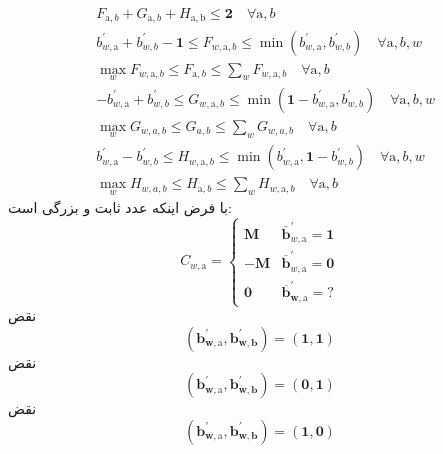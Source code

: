 \begin{equation}
	\begin{aligned}
		&{F}_{\mathrm{a}, {b}}+{G}_{\mathrm{a}, {b}}+{H}_{\mathrm{a}, \mathrm{b}} \leq \mathbf{2} \quad \forall \mathrm{a}, {b}\\
		&{b}_{w, \mathrm{a}}^{\prime}+{b}_{w, {b}}^{\prime}-\mathbf{1} \leq {F}_{w, \mathrm{a}, {b}} \leq \min \left({b}_{w, \mathrm{a}}^{\prime}, {b}_{w, b}^{\prime}\right) \quad \forall \mathrm{a}, {b}, {w}\\
		&\max _{w} {F}_{w, \mathrm{a}, {b}} \leq {F}_{\mathrm{a}, {b}} \leq \sum_{w} {F}_{w, \mathrm{a}, {b}} \quad \forall \mathrm{a}, {b}\\
		&-{b}_{w, \mathrm{a}}^{\prime}+{b}_{w, {b}}^{\prime} \leq {G}_{w, \mathrm{a}, {b}} \leq \min \left(\mathbf{1}-{b}_{w, \mathrm{a}}^{\prime}, {b}_{w, b}^{\prime}\right) \quad \forall \mathrm{a}, {b}, {w}\\
		&\max _{w} G_{w, a, b} \leq G_{a, b} \leq \sum_{w} G_{w, a, b} \quad \forall \mathrm{a}, b\\
		&{b}_{w, \mathrm{a}}^{\prime}-{b}_{w, b}^{\prime} \leq {H}_{w, \mathrm{a}, {b}} \leq \min \left({b}_{w, \mathrm{a}}^{\prime}, \mathbf{1}-{b}_{w, {b}}^{\prime}\right) \quad \forall \mathrm{a}, {b}, {w}\\
		&\max _{w} H_{w, a, b} \leq H_{\mathrm{a}, b} \leq \sum_{w} H_{w, \mathrm{a}, b} \quad \forall \mathrm{a}, {b}
	\end{aligned}
\end{equation}
با فرض اینکه  عدد ثابت و بزرگی است: 
\begin{equation}
	C_{w, \mathrm{a}}=\left\{\begin{array}{cl}
		\boldsymbol{M} & \overline{\boldsymbol{b}}_{w, \mathrm{a}}^{\prime}=\mathbf{1} \\
		-\boldsymbol{M} & \overline{\boldsymbol{b}}_{w, \mathrm{a}}^{\prime}=\mathbf{0} \\
		\mathbf{0} & \overline{\boldsymbol{b}}_{\boldsymbol{w}, \mathrm{a}}^{\prime}=?
	\end{array}\right.
\end{equation}
نقض 
\begin{equation}
	\left(\boldsymbol{b}_{\boldsymbol{w}, \mathrm{a}}^{\prime}, \boldsymbol{b}_{\boldsymbol{w}, \boldsymbol{b}}^{\prime}\right)=(\mathbf{1}, \mathbf{1})
\end{equation}
نقض 
\begin{equation}
	\left(\boldsymbol{b}_{\boldsymbol{w}, \mathrm{a}}^{\prime}, \boldsymbol{b}_{\boldsymbol{w}, \boldsymbol{b}}^{\prime}\right)=(\mathbf{0}, \mathbf{1})
\end{equation}
نقض 
\begin{equation}
	\left(\boldsymbol{b}_{\boldsymbol{w}, \mathrm{a}}^{\prime}, \boldsymbol{b}_{\boldsymbol{w}, \boldsymbol{b}}^{\prime}\right)=(\mathbf{1}, \mathbf{0})
\end{equation}


